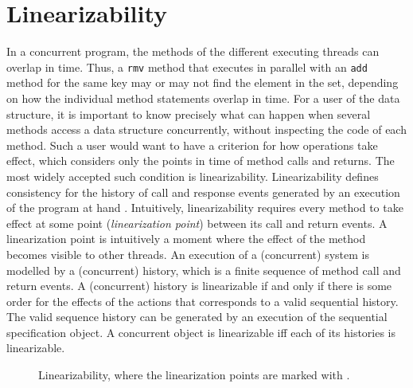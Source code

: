 \section{Linearizability}      
\label{section:specification:concurrent:data:structure}     
%         
\begingroup%
In a concurrent program, the methods of the different executing threads can overlap in time. Thus, a {\tt rmv} method that
executes in parallel with an {\tt add} method for the same key may or may not
find the element in the set, depending on how the individual method statements
overlap in time. For a user of the data structure, it is important to know precisely
what can happen when several methods access a data structure concurrently,
without inspecting the code of each method. Such a user would want to have
a criterion for how operations take effect, which considers only the points in
time of method calls and returns. The most widely accepted such condition is
linearizability.  
Linearizability defines consistency for the history
of call and response events generated by an execution of the program at hand \cite{HeWi:linearizability}. Intuitively, linearizability requires every method to take effect
at some point ({\emph {linearization point}}) between its call and return events. A linearization point is intuitively a moment where the effect of the method
becomes visible to other threads. An execution of a (concurrent) system is modelled by a (concurrent) history, which is a finite
sequence of method call and return events. A (concurrent) history is linearizable if and only if there is some order for
the effects of the actions that corresponds to a valid sequential history. The valid sequence history can be generated by an execution of the sequential specification object. A concurrent object is linearizable iff each of its histories
is linearizable.

\setlength\intextsep{\dazintextsep}
\begin{figure}[ht]
  \centering
  \caption{Linearizability, where the linearization points are marked with \protect\commitpoint{}.}
  \label{figure:shape:linearizability}  
\end{figure}          
  

